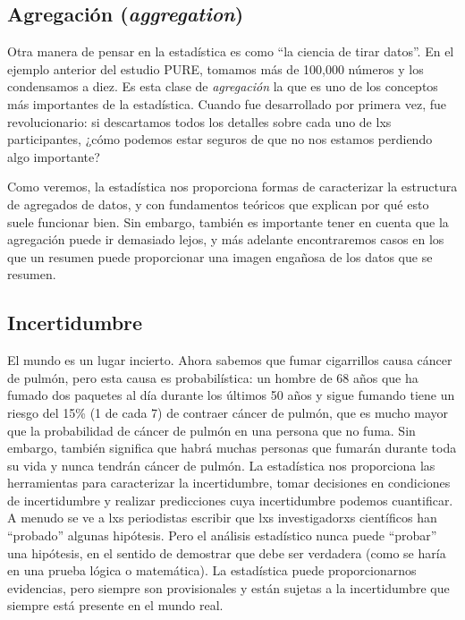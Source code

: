 \documentclass[
  12pt,
]{book}
\begin{document}
\hypertarget{agregaciuxf3n-aggregation}{%
\subsection{\texorpdfstring{Agregación (\emph{aggregation})}{Agregación (aggregation)}}\label{agregaciuxf3n-aggregation}}

Otra manera de pensar en la estadística es como ``la ciencia de tirar datos''. En el ejemplo anterior del estudio PURE, tomamos más de 100,000 números y los condensamos a diez. Es esta clase de \emph{agregación} la que es uno de los conceptos más importantes de la estadística. Cuando fue desarrollado por primera vez, fue revolucionario: si descartamos todos los detalles sobre cada uno de lxs participantes, ¿cómo podemos estar seguros de que no nos estamos perdiendo algo importante?

Como veremos, la estadística nos proporciona formas de caracterizar la estructura de agregados de datos, y con fundamentos teóricos que explican por qué esto suele funcionar bien. Sin embargo, también es importante tener en cuenta que la agregación puede ir demasiado lejos, y más adelante encontraremos casos en los que un resumen puede proporcionar una imagen engañosa de los datos que se resumen.

\hypertarget{incertidumbre}{%
\subsection{Incertidumbre}\label{incertidumbre}}

El mundo es un lugar incierto. Ahora sabemos que fumar cigarrillos causa cáncer de pulmón, pero esta causa es probabilística: un hombre de 68 años que ha fumado dos paquetes al día durante los últimos 50 años y sigue fumando tiene un riesgo del 15\% (1 de cada 7) de contraer cáncer de pulmón, que es mucho mayor que la probabilidad de cáncer de pulmón en una persona que no fuma. Sin embargo, también significa que habrá muchas personas que fumarán durante toda su vida y nunca tendrán cáncer de pulmón. La estadística nos proporciona las herramientas para caracterizar la incertidumbre, tomar decisiones en condiciones de incertidumbre y realizar predicciones cuya incertidumbre podemos cuantificar.
A menudo se ve a lxs periodistas escribir que lxs investigadorxs científicos han ``probado'' algunas hipótesis. Pero el análisis estadístico nunca puede ``probar'' una hipótesis, en el sentido de demostrar que debe ser verdadera (como se haría en una prueba lógica o matemática). La estadística puede proporcionarnos evidencias, pero siempre son provisionales y están sujetas a la incertidumbre que siempre está presente en el mundo real.
\end{document}
